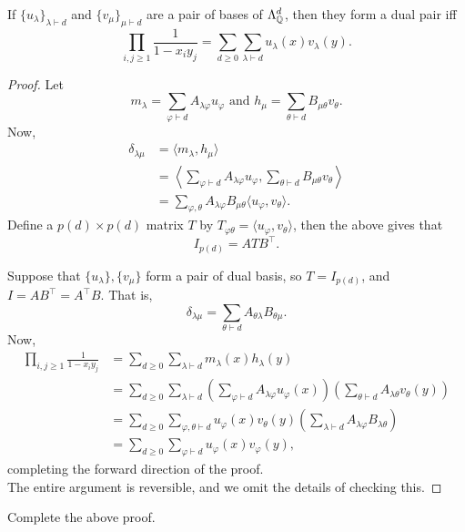 	\begin{ftheo}
		\label{theo: characterize dual basis}
		If $\{u_\lambda\}_{\lambda \vdash d}$ and $\{v_\mu\}_{\mu \vdash d}$ are a pair of bases of $\Lambda_{\mathbb{Q}}^d$, then they form a dual pair iff
		\[ \prod_{i,j \ge 1} \frac{1}{1-x_iy_j} = \sum_{d \ge 0} \sum_{\lambda \vdash d} u_\lambda(x) v_\lambda(y). \]
	\end{ftheo}
	\begin{proof}
		Let
		\[ m_\lambda = \sum_{\varphi \vdash d} A_{\lambda\varphi} u_\varphi \text{ and } h_\mu = \sum_{\theta \vdash d} B_{\mu\theta} v_\theta. \]
		Now,
		\begin{align*}
			\delta_{\lambda\mu} &= \langle m_\lambda , h_\mu \rangle \\
				&= \left\langle \sum_{\varphi \vdash d} A_{\lambda\varphi} u_\varphi , \sum_{\theta \vdash d} B_{\mu\theta} v_\theta \right\rangle \\
				&= \sum_{\varphi,\theta} A_{\lambda\varphi} B_{\mu\theta} \langle u_\varphi , v_\theta \rangle.
		\end{align*}
		Define a $p(d) \times p(d)$ matrix $T$ by $T_{\varphi\theta} = \langle u_\varphi , v_\theta \rangle$, then the above gives that
		\[ I_{p(d)} = A T B^\top. \]

		Suppose that $\{u_\lambda\},\{v_\mu\}$ form a pair of dual basis, so $T = I_{p(d)}$, and $I = AB^\top  = A^\top B$. That is,
		\[ \delta_{\lambda\mu} = \sum_{\theta \vdash d} A_{\theta\lambda} B_{\theta\mu}. \]
		Now,
		\begin{align*}
			\prod_{i,j \ge 1} \frac{1}{1-x_iy_j} &= \sum_{d \ge 0} \sum_{\lambda \vdash d} m_\lambda(x) h_\lambda(y) \\
				&= \sum_{d \ge 0} \sum_{\lambda \vdash d} \left( \sum_{\varphi \vdash d} A_{\lambda\varphi} u_\varphi(x) \right) \left( \sum_{\theta \vdash d} A_{\lambda\theta} v_\theta(y) \right) \\
				&= \sum_{d \ge 0} \sum_{\varphi,\theta \vdash d} u_\varphi(x) v_\theta(y) \left( \sum_{\lambda \vdash d} A_{\lambda\varphi} B_{\lambda\theta} \right) \\
				&= \sum_{d \ge 0} \sum_{\varphi \vdash d} u_\varphi(x) v_\varphi(y),
		\end{align*}
		completing the forward direction of the proof.\\
		The entire argument is reversible, and we omit the details of checking this.
	\end{proof}

	\begin{exercise}
		Complete the above proof.
	\end{exercise}


